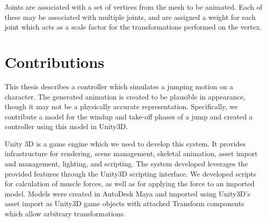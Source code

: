 Joints are associated with a set of vertices from the mesh to be animated.  Each of these may be associated with multiple joints, and are assigned a weight for each joint which acts as a scale factor for the transformations performed on the vertex. 

\section{Contributions}
	This thesis describes a controller which simulates a jumping motion on a character.  The generated animation is created to be plausible in appearance, though it may not be a physically accurate representation.  Specifically, we contribute a model for the windup and take-off phases of a jump and created a controller using this model in Unity3D.

	Unity 3D is a game engine which we used to develop this system.  It provides infrastructure for rendering, scene management, skeletal animation, asset import and management, lighting, and scripting.  The system developed leverages the provided features through the Unity3D scripting interface.  We developed scripts for calculation of muscle forces, as well as for applying the force to an imported model.  Models were created in AutoDesk Maya and imported using Unity3D's asset import as Unity3D game objects with attached Transform components which allow arbitrary transformations.
